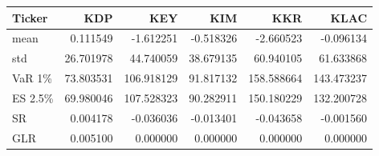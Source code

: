 \begin{tabular}{lrrrrr}
\toprule
Ticker & KDP & KEY & KIM & KKR & KLAC \\
\midrule
mean & 0.111549 & -1.612251 & -0.518326 & -2.660523 & -0.096134 \\
std & 26.701978 & 44.740059 & 38.679135 & 60.940105 & 61.633868 \\
VaR 1\% & 73.803531 & 106.918129 & 91.817132 & 158.588664 & 143.473237 \\
ES 2.5\% & 69.980046 & 107.528323 & 90.282911 & 150.180229 & 132.200728 \\
SR & 0.004178 & -0.036036 & -0.013401 & -0.043658 & -0.001560 \\
GLR & 0.005100 & 0.000000 & 0.000000 & 0.000000 & 0.000000 \\
\bottomrule
\end{tabular}

